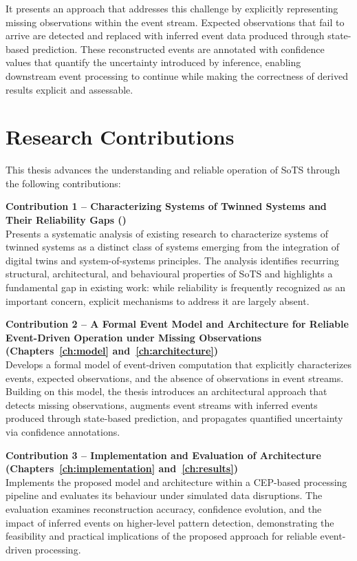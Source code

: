 It presents an approach that addresses this challenge by explicitly representing missing observations within the event stream. Expected observations that fail to arrive are detected and replaced with inferred event data produced through state-based prediction. These reconstructed events are annotated with confidence values that quantify the uncertainty introduced by inference, enabling downstream event processing to continue while making the correctness of derived results explicit and assessable.

\section*{Research Contributions}
This thesis advances the understanding and reliable operation of SoTS through the following contributions:

\textbf{Contribution 1 – Characterizing Systems of Twinned Systems and Their Reliability Gaps ()} \\
Presents a systematic analysis of existing research to characterize systems of twinned systems as a distinct class of systems emerging from the integration of digital twins and system-of-systems principles. The analysis identifies recurring structural, architectural, and behavioural properties of SoTS and highlights a fundamental gap in existing work: while reliability is frequently recognized as an important concern, explicit mechanisms to address it are largely absent.


\textbf{Contribution 2 – A Formal Event Model and Architecture for Reliable Event-Driven Operation under Missing Observations (Chapters~\ref{ch:model} and~\ref{ch:architecture})} \\
Develops a formal model of event-driven computation that explicitly characterizes events, expected observations, and the absence of observations in event streams. Building on this model, the thesis introduces an architectural approach that detects missing observations, augments event streams with inferred events produced through state-based prediction, and propagates quantified uncertainty via confidence annotations.

\textbf{Contribution 3 – Implementation and Evaluation of Architecture (Chapters~\ref{ch:implementation} and~\ref{ch:results})} \\
Implements the proposed model and architecture within a CEP-based processing pipeline and evaluates its behaviour under simulated data disruptions. The evaluation examines reconstruction accuracy, confidence evolution, and the impact of inferred events on higher-level pattern detection, demonstrating the feasibility and practical implications of the proposed approach for reliable event-driven processing.


